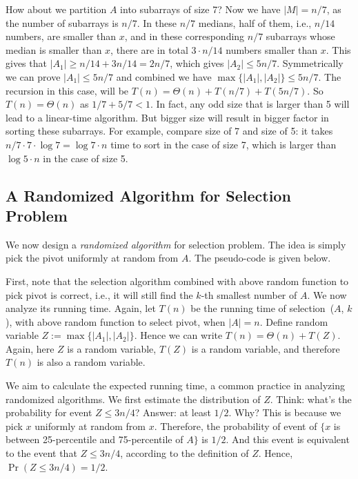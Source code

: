 How about we partition $A$ into subarrays of size 7?
Now we have $|M| = n/7$, as the number of subarrays is $n/7$.
In these $n/7$ medians, half of them, i.e., $n/14$ numbers, are smaller than $x$,
and in these corresponding $n/7$ subarrays whose median is smaller than $x$, there are in total $3\cdot n/14$ numbers smaller than $x$.
This gives that $|A_1| \ge n/14 + 3n/14 = 2n/7$, which gives $|A_2| \le 5n/7$. Symmetrically we can prove $|A_1| \le 5n/7$ and combined we have 
$\max\{|A_1|, |A_2|\} \le 5n/7$.
The recursion in this case, will be $T(n) = \Theta(n) + T(n/7) + T(5n/7)$.
So $T(n) = \Theta(n)$ as $1/7 + 5/7 < 1$. 
In fact, any odd size that is larger than 5 will lead to a linear-time algorithm.
But bigger size will result in bigger factor in sorting these subarrays. 
For example, compare size of 7 and size of 5: it takes $n/7 \cdot 7 \cdot \log 7 = \log 7 \cdot n$ time to sort in the case of size 7,
which is larger than $\log 5 \cdot n$ in the case of size 5.

\subsection*{A Randomized Algorithm for Selection Problem}

We now design a \emph{randomized algorithm} for selection problem.
The idea is simply pick the pivot uniformly at random from $A$.
The pseudo-code is given below.

\begin{minipage}{0.8\textwidth}
	\xxx
	\xxx
	\xxx
\end{minipage}

First, note that the selection algorithm combined with above random function to pick pivot is correct, i.e., it will still find the
$k$-th smallest number of $A$.
We now analyze its running time. 
Again, let $T(n)$ be the running time of selection~($A$, $k$), with above random function to select pivot, when $|A| = n$. 
Define random variable $Z := \max\{|A_1|, |A_2|\}$.
Hence we can write $T(n) = \Theta(n) + T(Z)$.
Again, here $Z$ is a random variable, $T(Z)$ is a random variable, and therefore $T(n)$ is also a random variable.

We aim to calculate the expected running time, a common practice in analyzing randomized algorithms.
We first estimate the distribution of $Z$.
Think: what's the probability for event $Z \le 3n/4$?
Answer: at least $1/2$. Why? This is because we pick $x$ uniformly at random from $x$.
Therefore, the probability of event of $\{x$ is between 25-percentile and 75-percentile of $A\}$ is $1/2$.
And this event is equivalent to the event that $Z \le 3n/4$, according to the definition of $Z$.
Hence, $\Pr(Z \le 3n/4) = 1/2$.

